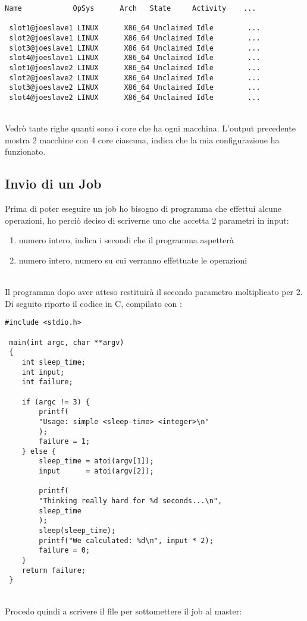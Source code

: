 \begin{lstlisting}[style=output]
 Name            OpSys      Arch   State     Activity    ...
 
 slot1@joeslave1 LINUX      X86_64 Unclaimed Idle        ...
 slot2@joeslave1 LINUX      X86_64 Unclaimed Idle        ...
 slot3@joeslave1 LINUX      X86_64 Unclaimed Idle        ...
 slot4@joeslave1 LINUX      X86_64 Unclaimed Idle        ...
 slot1@joeslave2 LINUX      X86_64 Unclaimed Idle        ...
 slot2@joeslave2 LINUX      X86_64 Unclaimed Idle        ...
 slot3@joeslave2 LINUX      X86_64 Unclaimed Idle        ...
 slot4@joeslave2 LINUX      X86_64 Unclaimed Idle        ...
\end{lstlisting}
\ \\
Vedr\`{o} tante righe quanti sono i core che ha ogni macchina. L'output precedente mostra 2 macchine con 4 core ciascuna, indica che la mia configurazione ha funzionato.

\subsection{Invio di un Job}

Prima di poter eseguire un job ho bisogno di programma che effettui alcune operazioni, ho perci\`{o} deciso di scriverne uno che accetta 2 parametri in input:

\begin{enumerate}
	\item numero intero, indica i secondi che il programma aspetter\`{a}
	\item numero intero, numero su cui verranno effettuate le operazioni
\end{enumerate}
\ \\
Il programma dopo aver atteso restituir\`{a} il secondo parametro moltiplicato per 2.\\
Di seguito riporto il codice in C, compilato con :

\begin{lstlisting}[style=c]
 #include <stdio.h>
 
 main(int argc, char **argv)
 {
	int sleep_time;
	int input;
	int failure;
	
	if (argc != 3) {
		printf(
		"Usage: simple <sleep-time> <integer>\n"
		);
		failure = 1;
	} else {
		sleep_time = atoi(argv[1]);
		input      = atoi(argv[2]);
		
		printf(
		"Thinking really hard for %d seconds...\n",
		sleep_time
		);
		sleep(sleep_time);
		printf("We calculated: %d\n", input * 2);
		failure = 0;
	}
	return failure;
 }
\end{lstlisting}
\ \\
Procedo quindi a scrivere il file  per sottomettere il job al master: 

